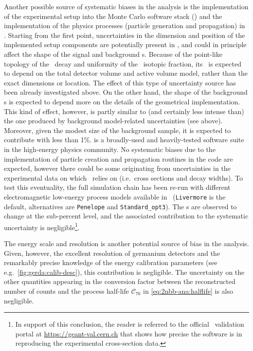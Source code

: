 \begin{description}[wide]
  \item[\mage\ and \geant{}] Another possible source of systematic biases in the analysis
    is the implementation of the experimental setup into the Monte Carlo software stack
    (\mage) and the implementation of the physics processes (particle generation and
    propagation) in \geant. Starting from the first point, uncertainties in the dimension
    and position of the implemented setup components are potentially present in \mage, and
    could in principle affect the shape of the signal and background \pdf{}s. Because of the
    point-like topology of the \nnbb\ decay and uniformity of the \gesix\ isotopic
    fraction, its \pdf\ is expected to depend on the total detector volume and active volume
    model, rather than the exact dimensions or location. The effect of this type of
    uncertainty source has been already investigated above. On the other hand, the shape
    of the background \pdf{}s is expected to depend more on the details of the geometrical
    implementation. This kind of effect, however, is partly similar to (and certainly less
    intense than) the one produced by background model-related uncertainties (see above).
    Moreover, given the modest size of the background sample, it is expected to contribute
    with less than 1\%.
    \newpar
    \geant{} is a broadly-used and heavily-tested software suite in the high-energy
    physics community. No systematic biases due to the implementation of particle creation
    and propagation routines in the code are expected, however there could be some
    originating from uncertainties in the experimental data on which \geant\ relies on
    (i.e.~cross sections and decay widths). To test this eventuality, the full simulation
    chain has been re-run with different electromagnetic low-energy process models
    available in \geant\ (\texttt{Livermore} is the default, alternatives are
    \texttt{Penelope} and \texttt{Standard\_opt3}). The \pdf{}s are observed to change at the
    sub-percent level, and the associated contribution to the systematic uncertainty is
    negligible\footnote{%
      In support of this conclusion, the reader is referred to the official \geant\
      validation portal at \url{https://geant-val.cern.ch} that shows how precise the
      software is in reproducing the experimental cross-section data. 
    }.

  \item[Other sources] The energy scale and resolution is another potential source of
    bias in the analysis. Given, however, the excellent resolution of germanium detectors
    and the remarkably precise knowledge of the energy calibration parameters (see
    e.g.~\cref{fig:gerda:calib-desc}), this contribution is negligible. The uncertainty on
    the other quantities appearing in the conversion factor between the reconstructed
    number of counts and the process half-life $\mathcal{C}_{76}$ in
    \cref{eq:2nbb-ana:halflife} is also negligible.

\end{description}

